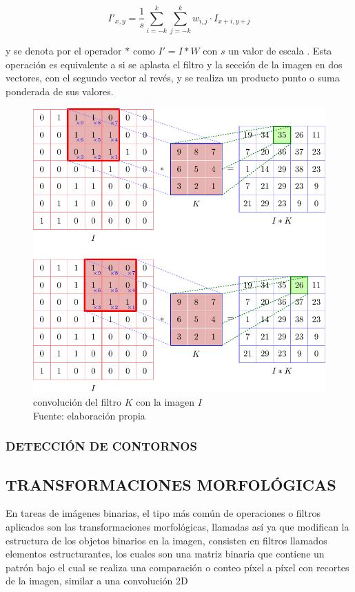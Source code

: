         \begin{equation}
            I'_{x,y} = \frac{1}{s} \sum_{i=-k}^{k} \sum_{j=-k}^{k} w_{i, j}\cdot I_{x+i, y+j}
        \end{equation}
        
        y se denota por el operador $*$ como $I' = I*W$ con $s$ un valor de escala \citep{10.5555/2584519}. Esta operación es equivalente a si se aplasta el filtro y la sección de la imagen en dos vectores, con el segundo vector al revés, y se realiza un producto punto o suma ponderada de sus valores.
        
        \begin{figure}[H]
        	\centering
        	\includegraphics[scale=0.82]{imagenes/conv1}
        	\caption[Convolución del filtro $K$ con la imagen $I$]{convolución del filtro $K$ con la imagen $I$\\Fuente: elaboración propia}
        \end{figure}
    
    	\subsubsection{DETECCIÓN DE CONTORNOS}
    		
        
        \subsection{TRANSFORMACIONES MORFOLÓGICAS}
        	En tareas de imágenes binarias, el tipo más común de operaciones o filtros aplicados son las transformaciones morfológicas, llamadas así ya que modifican la estructura de los objetos binarios en la imagen, consisten en filtros llamados elementos estructurantes, los cuales son una matriz binaria que contiene un patrón bajo el cual se realiza una comparación o conteo píxel a píxel con recortes de la imagen, similar a una convolución 2D \citep{szeliski}
